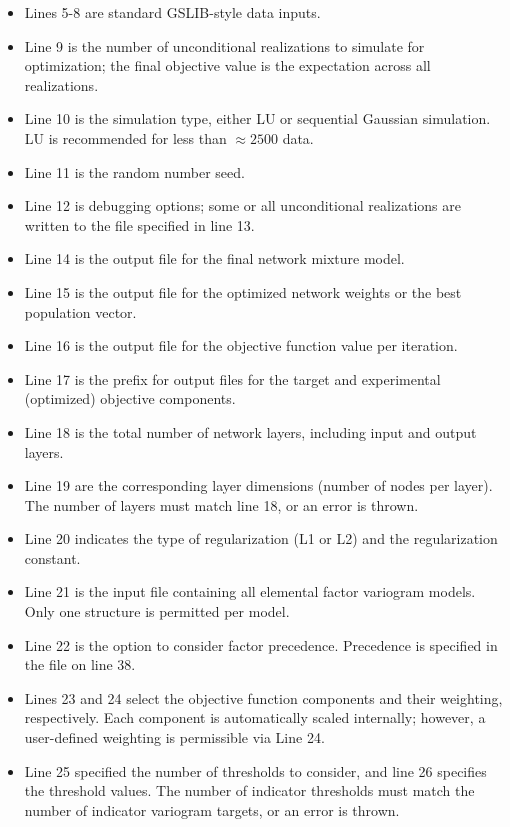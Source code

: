 \begin{itemize}[noitemsep]
   \item Lines 5-8 are standard GSLIB-style data inputs.
   \item Line 9 is the number of unconditional realizations to simulate for optimization; the final objective value is the expectation across all realizations.
   \item Line 10 is the simulation type, either LU or sequential Gaussian simulation. LU is recommended for less than $\approx 2500$ data.
   \item Line 11 is the random number seed.
   \item Line 12 is debugging options; some or all unconditional realizations are written to the file specified in line 13.
   \item Line 14 is the output file for the final network mixture model.
   \item Line 15 is the output file for the optimized network weights or the best population vector.
   \item Line 16 is the output file for the objective function value per iteration.
   \item Line 17 is the prefix for output files for the target and experimental (optimized) objective components.
   \item Line 18 is the total number of network layers, including input and output layers.
   \item Line 19 are the corresponding layer dimensions (number of nodes per layer). The number of layers must match line 18, or an error is thrown.
   \item Line 20 indicates the type of regularization (L1 or L2) and the regularization constant.
   \item Line 21 is the input file containing all elemental factor variogram models. Only one structure is permitted per model.
   \item Line 22 is the option to consider factor precedence. Precedence is specified in the file on line 38.
   \item Lines 23 and 24 select the objective function components and their weighting, respectively. Each component is automatically scaled internally; however, a user-defined weighting is permissible via Line 24.
   \item Line 25 specified the number of thresholds to consider, and line 26 specifies the threshold values. The number of indicator thresholds must match the number of indicator variogram targets, or an error is thrown.

\end{itemize}
